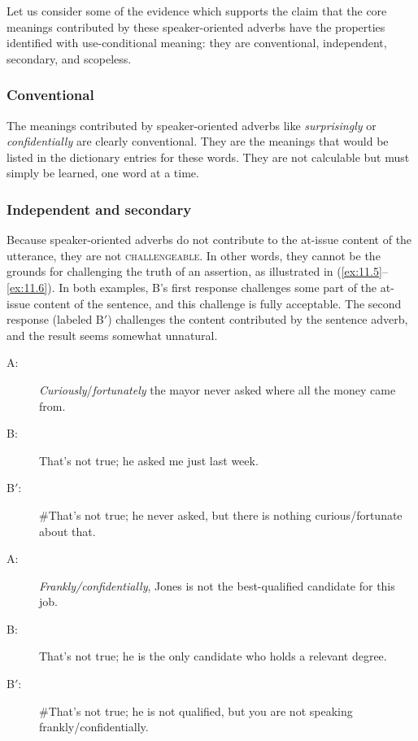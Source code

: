 Let us consider some of the evidence which supports the claim that the core meanings contributed by these speaker-oriented adverbs have the properties identified with use-conditional meaning: they are conventional, independent, secondary, and scopeless.



\subsubsection{Conventional}

The meanings contributed by speaker-oriented adverbs like \textit{surprisingly} or \textit{confidentially} are clearly conventional. They are the meanings that would be listed in the dictionary entries for these words. They are not calculable but must simply be learned, one word at a time.


\subsubsection{Independent and secondary}

Because speaker-oriented adverbs do not contribute to the at-issue content of the utterance, they are not \textsc{challengeable}. In other words, they cannot be the grounds for challenging the truth of an assertion, as illustrated in (\ref{ex:11.5}–\ref{ex:11.6}). In both examples, B’s first response challenges some part of the at-issue content of the sentence, and this challenge is fully acceptable. The second response (labeled B$'$) challenges the content contributed by the sentence adverb, and the result seems somewhat unnatural.



\ea \label{ex:11.5}
\begin{description}
\item[A:] \textit{Curiously}/\textit{fortunately} the mayor never asked where all the money came from.
\item[B:] That’s not true; he asked me just last week.
\item[B$'$:] \#That’s not true; he never asked, but there is nothing curious/fortunate about that.
\end{description}
\ex \label{ex:11.6}
\begin{description}
\item[A:] \textit{Frankly/confidentially}, Jones is not the best-qualified candidate for this job.
\item[B:] That’s not true; he is the only candidate who holds a relevant degree.
\item[B$'$:] \#That’s not true; he is not qualified, but you are not speaking frankly/confidentially.
\end{description}
\z


